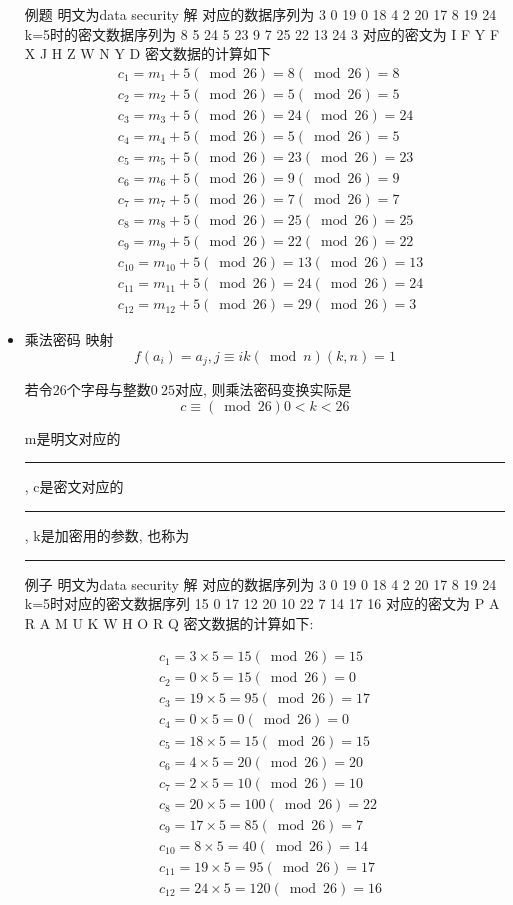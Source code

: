 \documentclass[UTF8]{ctexart}
\newcommand\hl{\bgroup\markoverwith
  {\textcolor{yellow}{\rule[-.5ex]{2pt}{2.5ex}}}\ULon}
\begin{document}
\begin{itemize}
        例题 明文为data security
        解 对应的数据序列为 3 0 19 0 18 4 2 20 17 8 19 24
        k=5时的密文数据序列为 8 5 24 5 23 9 7 25 22 13 24 3
        对应的密文为          I F Y F X J H Z W N Y D
        密文数据的计算如下
        $$
        \begin{aligned}
            &c_1=m_1+5(\bmod 26)=8(\bmod 26)=8\\
            &c_2=m_2+5(\bmod 26)=5(\bmod 26)=5\\
            &c_3=m_3+5(\bmod 26)=24(\bmod 26)=24\\
            &c_4=m_4+5(\bmod 26)=5(\bmod 26)=5\\
            &c_5=m_5+5(\bmod 26)=23(\bmod 26)=23\\
            &c_6=m_6+5(\bmod 26)=9(\bmod 26)=9\\
            &c_7=m_7+5(\bmod 26)=7(\bmod 26)=7\\
            &c_8=m_8+5(\bmod 26)=25(\bmod 26)=25\\
            &c_9=m_9+5(\bmod 26)=22(\bmod 26)=22\\
            &c_{10}=m_{10}+5(\bmod 26)=13(\bmod 26)=13\\
            &c_{11}=m_{11}+5(\bmod 26)=24(\bmod 26)=24\\
            &c_{12}=m_{12}+5(\bmod 26)=29(\bmod 26)=3
        \end{aligned}
        $$

        \item 乘法密码
        映射
        $$f(a_i)=a_j, j\equiv ik(\bmod n) (k, n)=1$$

        若令26个字母与整数$0~25$对应, 则乘法密码变换实际是
        $$c\equiv (\bmod 26) 0<k<26$$

        m是明文对应的\hl{明文数据}, c是密文对应的\hl{密文数据}, k是加密用的参数, 也称为\hl{密钥}

        例子 明文为data security
        解 对应的数据序列为 3 0 19 0 18 4 2 20 17 8 19 24
        k=5时对应的密文数据序列 15 0 17 12 20 10 22 7 14 17 16
        对应的密文为 P A R A M U K W H O R Q
        密文数据的计算如下:

        $$
        \begin{aligned}
            &c_1=3\times 5=15(\bmod 26)=15\\
            &c_2=0\times 5=15(\bmod 26)=0\\
            &c_3=19\times 5=95(\bmod 26)=17\\
            &c_4=0\times 5=0(\bmod 26)=0\\
            &c_5=18\times 5=15(\bmod 26)=15\\
            &c_6=4\times 5=20(\bmod 26)=20\\
            &c_7=2\times 5=10(\bmod 26)=10\\
            &c_8=20\times 5=100(\bmod 26)=22\\
            &c_9=17\times 5=85(\bmod 26)=7\\
            &c_10=8\times 5=40(\bmod 26)=14\\
            &c_11=19\times 5=95(\bmod 26)=17\\
            &c_12=24\times 5=120(\bmod 26)=16
        \end{aligned}
        $$


\end{itemize}
\end{document}
